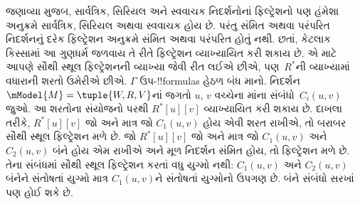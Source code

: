 \documentclass[../../../include/open-logic-section]{subfiles}
\begin{document}


જણાવ્યા મુજબ, સાર્વત્રિક, સિરિયલ અને સ્વવાચક નિદર્શનોનાં
ફિલ્ટ્રેશનો પણ હંમેશા અનુક્રમે સાર્વત્રિક, સિરિયલ અથવા સ્વવાચક
હોય છે. પરંતુ સંમિત અથવા પરંપરિત નિદર્શનનું દરેક ફિલ્ટ્રેશન
અનુક્રમે સંમિત અથવા પરંપરિત હોતું નથી. છતાં, કેટલાક કિસ્સામાં
આ ગુણધર્મ જળવાય તે રીતે ફિલ્ટ્રેશન વ્યાખ્યાયિત કરી શકાય છે.
એ માટે આપણે સૌથી સ્થૂલ ફિલ્ટ્રેશનની વ્યાખ્યા જેવી રીત લઈએ છીએ,
પણ~$R^*$ની વ્યાખ્યામાં વધારાની શરતો ઉમેરીએ છીએ. $\Gamma$
ઉપ-!!{formula}s હેઠળ બંધ માનો. નિદર્શન
$\mModel{M} =\tuple{W, R, V}$નાં જગતો $u$, $v$ વચ્ચેના
માંના સંબંધો~$C_i(u,v)$ જુઓ.
આ શરતોના સંયોજનો પરથી $R^*[u][v]$ વ્યાખ્યાયિત કરી શકાય છે.
દાખલા તરીકે, $R^*[u][v]$ જો અને માત્ર જો $C_1(u,v)$ હોય એવી
શરત રાખીએ, તો બરાબર સૌથી સ્થૂલ ફિલ્ટ્રેશન મળે છે. જો
$R^*[u][v]$ જો અને માત્ર જો $C_1(u,v)$ અને $C_2(u, v)$ બંને
હોય એમ રાખીએ અને મૂળ નિદર્શન સંમિત હોય, તો ફિલ્ટ્રેશન મળે છે.
તેના સંબંધમાં સૌથી સ્થૂલ ફિલ્ટ્રેશન કરતાં વધુ યુગ્મો નથી:
$C_1(u,v)$ અને $C_2(u,v)$ બંનેને સંતોષતાં યુગ્મો માત્ર
$C_1(u,v)$ને સંતોષતાં યુગ્મોનો ઉપગણ છે. બંને સંબંધો સરખાં પણ
હોઈ શકે છે.

\end{document}
